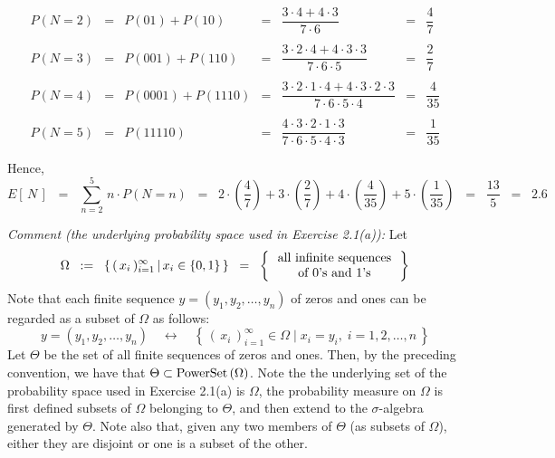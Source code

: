 \begin{equation*}
\begin{array}{ccccccc}
P(N = 2) & = & P(01) + P(10)
         & = & \dfrac{3 \cdot 4 + 4 \cdot 3}{7\cdot 6}
         & = & \dfrac{4}{7}
\\ \\
P(N = 3) & = & P(001) + P(110)
         & = & \dfrac{3 \cdot 2 \cdot 4 + 4 \cdot 3 \cdot 3}{7\cdot 6 \cdot 5}
         & = & \dfrac{2}{7}
\\ \\
P(N = 4) & = & P(0001) + P(1110)
         & = & \dfrac{3 \cdot 2 \cdot 1 \cdot 4 + 4 \cdot 3 \cdot 2 \cdot 3}{7\cdot 6 \cdot 5 \cdot 4}
         & = & \dfrac{4}{35}
\\ \\
P(N = 5) & = & P(11110)
         & = & \dfrac{4 \cdot 3 \cdot 2 \cdot 1 \cdot 3}{7\cdot 6 \cdot 5 \cdot 4 \cdot 3}
         & = & \dfrac{1}{35}
\\ \\
\end{array}
\end{equation*}
Hence,
\begin{equation*}
E\left[\,N\,\right]
\;\;=\;\;   \sum_{n=2}^{5} \, n \cdot P(N = n)
\;\;=\;\;   2\cdot\left(\dfrac{4}{7}\right) + 3\cdot\left(\dfrac{2}{7}\right)
          + 4\cdot\left(\dfrac{4}{35}\right) + 5\cdot\left(\dfrac{1}{35}\right)
\;\;=\;\;   \dfrac{13}{5} \;\; = \;\; 2.6
\end{equation*}

\vskip 1.0cm
\noindent
\textit{Comment (the underlying probability space used in Exercise 2.1(a)):}
\vskip 0.1cm
\noindent
Let
\begin{equation*}
\Omega
\;\; := \;\;
\left\{\,
(\,x_{i}\,)_{i=1}^{\infty}
\,\vert\,
x_{i} \in \{0,1\}
\,\right\}
\;\; = \;\;
\left\{\,
\begin{array}{c}
\textnormal{all infinite sequences} \\ \textnormal{of $0$'s and $1$'s}
\end{array}
\,\right\}
\end{equation*}
Note that each finite sequence $y = \left(y_{1},y_{2},\ldots,y_{n}\right)$ of zeros and ones
can be regarded as a subset of $\Omega$ as follows:
\begin{equation*}
y = (y_{1},y_{2},\ldots,y_{n})
\quad\longleftrightarrow\quad
\left\{\,
(\,x_{i}\,)_{i=1}^{\infty} \in \Omega
\;\vert\;
x_{i} = y_{i},\;i = 1,2,\ldots,n
\,\right\}
\end{equation*}
Let $\Theta$ be the set of all finite sequences of zeros and ones.
Then, by the preceding convention, we have that
$\Theta \subset \textnormal{PowerSet}\left(\Omega\right)$.
Note the the underlying set of the probability space used in Exercise 2.1(a) is $\Omega$,
the probability measure on $\Omega$ is first defined subsets of $\Omega$ belonging to $\Theta$,
and then extend to the $\sigma$-algebra generated by $\Theta$.
Note also that, given any two members of $\Theta$ (as subsets of $\Omega$), either they are
disjoint or one is a subset of the other.


